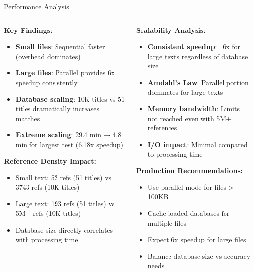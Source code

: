 \documentclass[aspectratio=169]{beamer}
\begin{document}
\begin{frame}{Performance Analysis}
\begin{columns}
\begin{column}{0.5\textwidth}
\textbf{Key Findings:}
\begin{itemize}
    \item \textbf{Small files}: Sequential faster (overhead dominates)
    \item \textbf{Large files}: Parallel provides 6x speedup consistently
    \item \textbf{Database scaling}: 10K titles vs 51 titles dramatically increases matches
    \item \textbf{Extreme scaling}: 29.4 min → 4.8 min for largest test (6.18x speedup)
\end{itemize}

\vspace{0.3cm}
\textbf{Reference Density Impact:}
\begin{itemize}
    \item Small text: 52 refs (51 titles) vs 3743 refs (10K titles)
    \item Large text: 193 refs (51 titles) vs 5M+ refs (10K titles)
    \item Database size directly correlates with processing time
\end{itemize}
\end{column}
\begin{column}{0.5\textwidth}
\textbf{Scalability Analysis:}
\begin{itemize}
    \item \textbf{Consistent speedup}: ~6x for large texts regardless of database size
    \item \textbf{Amdahl's Law}: Parallel portion dominates for large texts
    \item \textbf{Memory bandwidth}: Limits not reached even with 5M+ references
    \item \textbf{I/O impact}: Minimal compared to processing time
\end{itemize}

\vspace{0.3cm}
\textbf{Production Recommendations:}
\begin{itemize}
    \item Use parallel mode for files > 100KB
    \item Cache loaded databases for multiple files
    \item Expect 6x speedup for large files
    \item Balance database size vs accuracy needs
\end{itemize}
\end{column}
\end{columns}
\end{frame}
\end{document}
